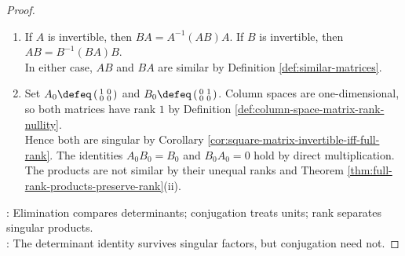 \begin{proposition}
\begin{proof}
\begin{enumerate}[label=(\roman*)]
The right sides have determinants $\det(I_n-z^{-1}BA)$ and $\det(I_n-z^{-1}AB)$, respectively, by Theorem \ref{thm:block-upper-triangular-determinant} and Theorem \ref{thm:determinant-basic-laws}(ix).\\
Thus $\det(I_n-z^{-1}AB)=\det M=\det(I_n-z^{-1}BA)$ by Theorem \ref{thm:determinant-basic-laws}(vi).\\
For $T\in\{AB,BA\}$, $p_T(z)=\det(zI_n-T)$ by Definition \ref{def:matrix-characteristic-polynomial}.\\
The identity $\det(zI_n-T)=z^n\det(I_n-z^{-1}T)$ holds by repeated column linearity in Theorem \ref{thm:determinant-basic-laws}(ii).\\
Hence $p_{AB}=p_{BA}$ by the preceding determinant equality.
\item If $A$ is invertible, then $BA=A^{-1}(AB)A$. If $B$ is invertible, then $AB=B^{-1}(BA)B$.\\
In either case, $AB$ and $BA$ are similar by Definition \ref{def:similar-matrices}.
\item Set $A_0\defeq\left(\begin{smallmatrix}1&0\\0&0\end{smallmatrix}\right)$ and $B_0\defeq\left(\begin{smallmatrix}0&1\\0&0\end{smallmatrix}\right)$. Column spaces are one-dimensional, so both matrices have rank $1$ by Definition \ref{def:column-space-matrix-rank-nullity}.\\
Hence both are singular by Corollary \ref{cor:square-matrix-invertible-iff-full-rank}. The identities $A_0B_0=B_0$ and $B_0A_0=0$ hold by direct multiplication.\\
The products are not similar by their unequal ranks and Theorem \ref{thm:full-rank-products-preserve-rank}(ii).
\end{enumerate}
: Elimination compares determinants; conjugation treats units; rank separates singular products.\\
: The determinant identity survives singular factors, but conjugation need not.
\end{proof}
\end{proposition}

